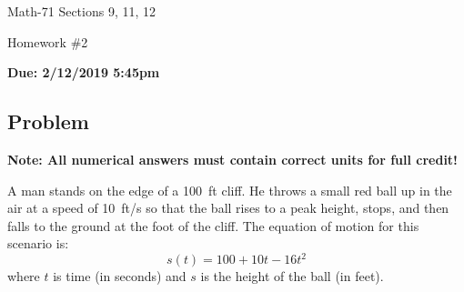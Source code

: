 \documentclass[letterpaper,12pt,fleqn]{article}
\begin{document}
\begin{center}
  \large
  Math-71 Sections 9, 11, 12

  \Large
  Homework \#2

  \large
  \textbf{Due: 2/12/2019 5:45pm}
\end{center}

\subsection*{Problem}

\textbf{Note: All numerical answers must contain correct units for full credit!}

A man stands on the edge of a \SI{100}{ft} cliff.  He throws a small red ball up in the air at a speed of \SI{10}{ft/s} so
that the ball rises to a peak height, stops, and then falls to the ground at the foot of the cliff.  The equation of motion
for this scenario is:
\[s(t)=100+10t-16t^2\]
where \(t\) is time (in seconds) and \(s\) is the height of the ball (in feet).
\end{document}
